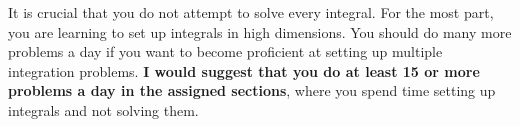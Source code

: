 It is crucial that you do not attempt to solve every integral.  For
the most part, you are learning to set up integrals in high
dimensions. You should do many more problems a day if you want
to become proficient at setting up multiple integration problems.  \textbf{I would suggest
  that you do at least 15 or more problems a day in the assigned
  sections}, where you spend time setting up integrals and not solving
them.


